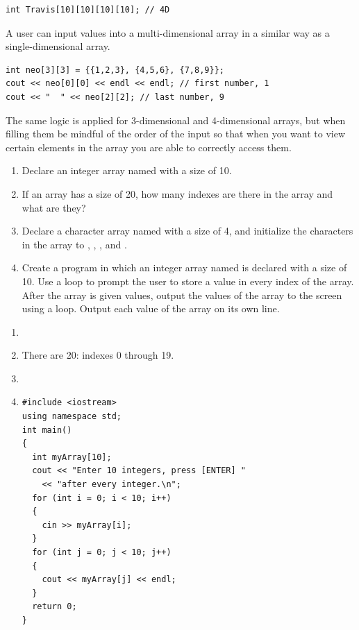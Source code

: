 \noindent\begin{minipage}{\linewidth}\begin{lstlisting}
int Travis[10][10][10][10]; // 4D
\end{lstlisting}\end{minipage}

A user can input values into a multi-dimensional array in a similar way as a single-dimensional array. 

\noindent\begin{minipage}{\linewidth}\begin{lstlisting}
int neo[3][3] = {{1,2,3}, {4,5,6}, {7,8,9}}; 
cout << neo[0][0] << endl << endl; // first number, 1
cout << "  " << neo[2][2]; // last number, 9
\end{lstlisting}\end{minipage}


The same logic is applied for 3-dimensional and 4-dimensional arrays, but when filling them be mindful of the order of the input so that when you want to view certain elements in the array you are able to correctly access them. 


\begin{enumerate}
	\item Declare an integer array named  with a size of 10.
  \item If an array has a size of 20, how many indexes are there in the array and what are they?
  \item Declare a character array named  with a size of 4, and initialize the characters in the array to , , , and . 
  \item 
  Create a program in which an integer array named  is declared with a size of 10. 
  Use a  loop to prompt the user to store a value in every index of the array. 
  After the array is given values, output the values of the array to the screen using a  loop. 
  Output each value of the array on its own line.
\end{enumerate}


\begin{enumerate}
	\item {}
  \item There are 20: indexes 0 through 19.
  \item {}
  \item 
\noindent\begin{minipage}{\linewidth}\begin{lstlisting}
#include <iostream>
using namespace std;
int main()
{
  int myArray[10];
  cout << "Enter 10 integers, press [ENTER] "
    << "after every integer.\n";
  for (int i = 0; i < 10; i++)
  {
    cin >> myArray[i];
  }
  for (int j = 0; j < 10; j++)
  {
    cout << myArray[j] << endl;
  }
  return 0;
}
\end{lstlisting}\end{minipage}
\end{enumerate}

